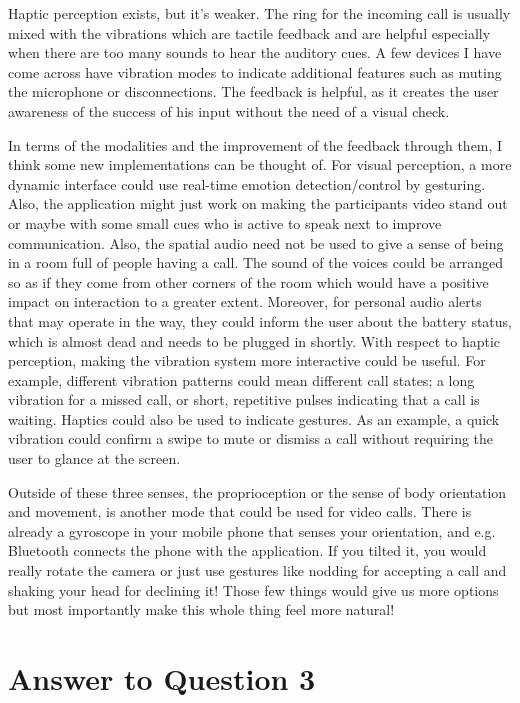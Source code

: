 \documentclass[
	letterpaper, %
]{jdf}
\begin{document}
Haptic perception exists, but it's weaker. The ring for the incoming call is usually mixed with the vibrations which are tactile feedback and are helpful especially when there are too many sounds to hear the auditory cues. A few devices I have come across have vibration modes to indicate additional features such as muting the microphone or disconnections. The feedback is helpful, as it creates the user awareness of the success of his input without the need of a visual check.

In terms of the modalities and the improvement of the feedback through them, I think some new implementations can be thought of. For visual perception, a more dynamic interface could use real-time emotion detection/control by gesturing. Also, the application might just work on making the participants video stand out or maybe with some small cues who is active to speak next to improve communication. Also, the spatial audio need not be used to give a sense of being in a room full of people having a call. The sound of the voices could be arranged so as if they come from other corners of the room which would have a positive impact on interaction to a greater extent.  Moreover, for personal audio alerts that may operate in the way, they could inform the user about the battery status, which is almost dead and needs to be plugged in shortly. With respect to haptic perception, making the vibration system more interactive could be useful. For example, different vibration patterns could mean different call states; a long vibration for a missed call, or short, repetitive pulses indicating that a call is waiting. Haptics could also be used to indicate gestures. As an example, a quick vibration could confirm a swipe to mute or dismiss a call without requiring the user to glance at the screen.

Outside of these three senses, the proprioception or the sense of body orientation and movement, is another mode that could be used for video calls. There is already a gyroscope in your mobile phone that senses your orientation, and e.g. Bluetooth connects the phone with the application. If you tilted it, you would really rotate the camera or just use gestures like nodding for accepting a call and shaking your head for declining it! Those few things would give us more options but most importantly make this whole thing feel more natural!

\newpage

\section{Answer to Question 3}
\end{document}
